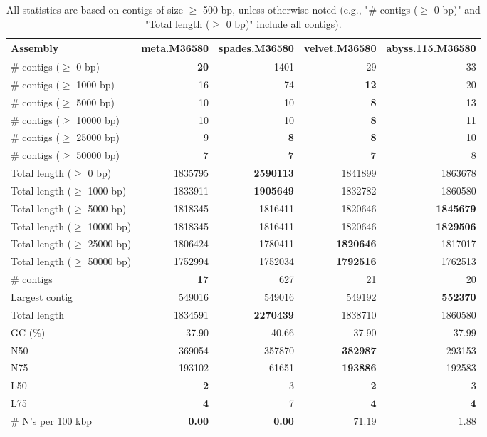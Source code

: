 \documentclass[12pt,a4paper]{article}
\begin{document}
\begin{table}[ht]
\begin{center}
\caption{All statistics are based on contigs of size $\geq$ 500 bp, unless otherwise noted (e.g., "\# contigs ($\geq$ 0 bp)" and "Total length ($\geq$ 0 bp)" include all contigs).}
\begin{tabular}{|l*{4}{|r}|}
\hline
Assembly & meta.M36580 & spades.M36580 & velvet.M36580 & abyss.115.M36580 \\ \hline
\# contigs ($\geq$ 0 bp) & {\bf 20} & 1401 & 29 & 33 \\ \hline
\# contigs ($\geq$ 1000 bp) & 16 & 74 & {\bf 12} & 20 \\ \hline
\# contigs ($\geq$ 5000 bp) & 10 & 10 & {\bf 8} & 13 \\ \hline
\# contigs ($\geq$ 10000 bp) & 10 & 10 & {\bf 8} & 11 \\ \hline
\# contigs ($\geq$ 25000 bp) & 9 & {\bf 8} & {\bf 8} & 10 \\ \hline
\# contigs ($\geq$ 50000 bp) & {\bf 7} & {\bf 7} & {\bf 7} & 8 \\ \hline
Total length ($\geq$ 0 bp) & 1835795 & {\bf 2590113} & 1841899 & 1863678 \\ \hline
Total length ($\geq$ 1000 bp) & 1833911 & {\bf 1905649} & 1832782 & 1860580 \\ \hline
Total length ($\geq$ 5000 bp) & 1818345 & 1816411 & 1820646 & {\bf 1845679} \\ \hline
Total length ($\geq$ 10000 bp) & 1818345 & 1816411 & 1820646 & {\bf 1829506} \\ \hline
Total length ($\geq$ 25000 bp) & 1806424 & 1780411 & {\bf 1820646} & 1817017 \\ \hline
Total length ($\geq$ 50000 bp) & 1752994 & 1752034 & {\bf 1792516} & 1762513 \\ \hline
\# contigs & {\bf 17} & 627 & 21 & 20 \\ \hline
Largest contig & 549016 & 549016 & 549192 & {\bf 552370} \\ \hline
Total length & 1834591 & {\bf 2270439} & 1838710 & 1860580 \\ \hline
GC (\%) & 37.90 & 40.66 & 37.90 & 37.99 \\ \hline
N50 & 369054 & 357870 & {\bf 382987} & 293153 \\ \hline
N75 & 193102 & 61651 & {\bf 193886} & 192583 \\ \hline
L50 & {\bf 2} & 3 & {\bf 2} & 3 \\ \hline
L75 & {\bf 4} & 7 & {\bf 4} & {\bf 4} \\ \hline
\# N's per 100 kbp & {\bf 0.00} & {\bf 0.00} & 71.19 & 1.88 \\ \hline
\end{tabular}
\end{center}
\end{table}
\end{document}
